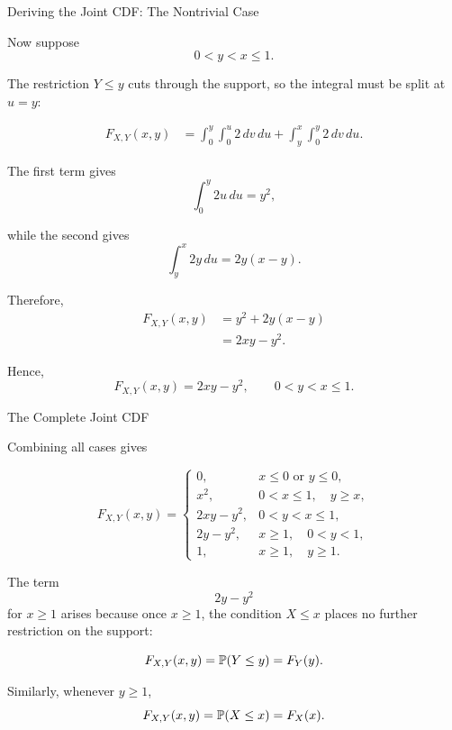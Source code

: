 \begin{frame}{Deriving the Joint CDF: The Nontrivial Case}

Now suppose
$$
0<y<x\le1.
$$

The restriction $Y\le y$ cuts through the support, so the integral
must be split at $u=y$:

$$
\begin{aligned}
F_{X,Y}(x,y)
&=
\int_0^y\int_0^u 2\,dv\,du
+
\int_y^x\int_0^y 2\,dv\,du.
\end{aligned}
$$

The first term gives
$$
\int_0^y 2u\,du
=
y^2,
$$

while the second gives
$$
\int_y^x 2y\,du
=
2y(x-y).
$$

Therefore,
$$
\begin{aligned}
F_{X,Y}(x,y)
&=
y^2+2y(x-y)\\
&=
2xy-y^2.
\end{aligned}
$$

Hence,
$$
{
F_{X,Y}(x,y)=2xy-y^2,
\qquad
0<y<x\le1.
}
$$


\end{frame}


\begin{frame}{The Complete Joint CDF}

Combining all cases gives

$$
\boxed{
F_{X,Y}(x,y)
=
\begin{cases}
0,
& x\le0 \text{ or } y\le0,
\\[2mm]
x^2,
& 0<x\le1,\quad y\ge x,
\\[2mm]
2xy-y^2,
& 0<y<x\le1,
\\[2mm]
2y-y^2,
& x\ge1,\quad 0<y<1,
\\[2mm]
1,
& x\ge1,\quad y\ge1.
\end{cases}
}
$$

The term
$$
2y-y^2
$$
for $x\ge1$ arises because once $x\ge1$, the condition $X\le x$
places no further restriction on the support:

$$
F_{X,Y}(x,y)
=
\mathbb{P}(Y\le y)
=
F_Y(y).
$$

Similarly, whenever $y\ge1$,
$$
F_{X,Y}(x,y)
=
\mathbb{P}(X\le x)
=
F_X(x).
$$

\end{frame}


